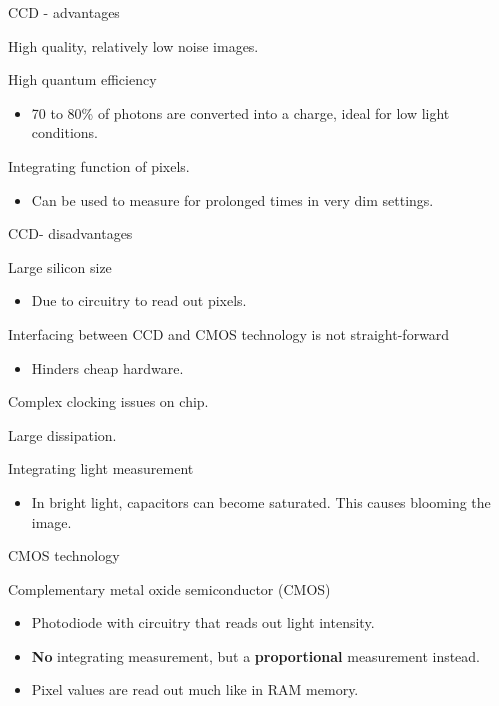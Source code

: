 \documentclass[compress]{beamer}
\begin{document}
\begin{frame}{CCD - advantages}

High quality, relatively low noise images.

High quantum efficiency

\begin{itemize}

\item
  70 to 80\% of photons are converted into a charge, ideal for low light
  conditions.
\end{itemize}

Integrating function of pixels.

\begin{itemize}

\item
  Can be used to measure for prolonged times in very dim settings.
\end{itemize}

\end{frame}

\begin{frame}{CCD- disadvantages}

Large silicon size

\begin{itemize}

\item
  Due to circuitry to read out pixels.
\end{itemize}

Interfacing between CCD and CMOS technology is not straight-forward

\begin{itemize}

\item
  Hinders cheap hardware.
\end{itemize}

Complex clocking issues on chip.

Large dissipation.

Integrating light measurement

\begin{itemize}

\item
  In bright light, capacitors can become saturated. This causes blooming
  the image.
\end{itemize}

\end{frame}

\begin{frame}{CMOS technology}

Complementary metal oxide semiconductor (CMOS)

\begin{itemize}

\item
  Photodiode with circuitry that reads out light intensity.
\item
  \textbf{No} integrating measurement, but a \textbf{proportional}
  measurement instead.
\item
  Pixel values are read out much like in RAM memory.
\end{itemize}

\end{frame}
\end{document}
